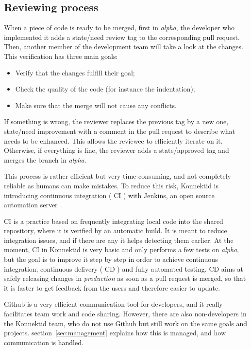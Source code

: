 \subsection{Reviewing process}
\label{ssec:reviewing}

When a piece of code is ready to be merged, first in \textit{alpha}, the developer who implemented it adds a \guillemotleft{} state/need review \guillemotright{} tag to the corresponding pull request. Then, another member of the development team will take a look at the changes. This verification has three main goals:

\begin{itemize}[noitemsep]
	\item Verify that the changes fulfill their goal;
 	\item Check the quality of the code (for instance the indentation);
	\item Make sure that the merge will not cause any conflicts.
\end{itemize}

If something is wrong, the reviewer replaces the previous tag by a new one, \guillemotleft{} state/need improvement \guillemotright{} with a comment in the pull request to describe what needs to be enhanced. This allows the reviewee to efficiently iterate on it. Otherwise, if everything is fine, the reviewer adds a \guillemotleft{} state/approved \guillemotright{} tag and merges the branch in \textit{alpha}.

This process is rather efficient but very time-consuming, and not completely reliable as humans can make mistakes. To reduce this risk, Konnektid is introducing continuous integration (\guillemotleft{} CI \guillemotright{}) with Jenkins, an open source automation server~\cite{jenkins}. 

CI is a practice based on frequently integrating local code into the shared repository, where it is verified by an automatic build. It is meant to reduce integration issues, and if there are any it helps detecting them earlier. At the moment, CI in Konnektid is very basic and only performs a few tests on \textit{alpha}, but the goal is to improve it step by step in order to achieve continuous integration, continuous delivery (\guillemotleft{} CD \guillemotright{}) and fully automated testing. CD aims at safely releasing changes in \textit{production} as soon as a pull request is merged, so that it is faster to get feedback from the users and therefore easier to update.

Github is a very efficient communication tool for developers, and it really facilitates team work and code sharing. However, there are also non-developers in the Konnektid team, who do not use Github but still work on the same goals and projects. {\sc section}~\ref{sec:management} explains how this is managed, and how communication is handled.